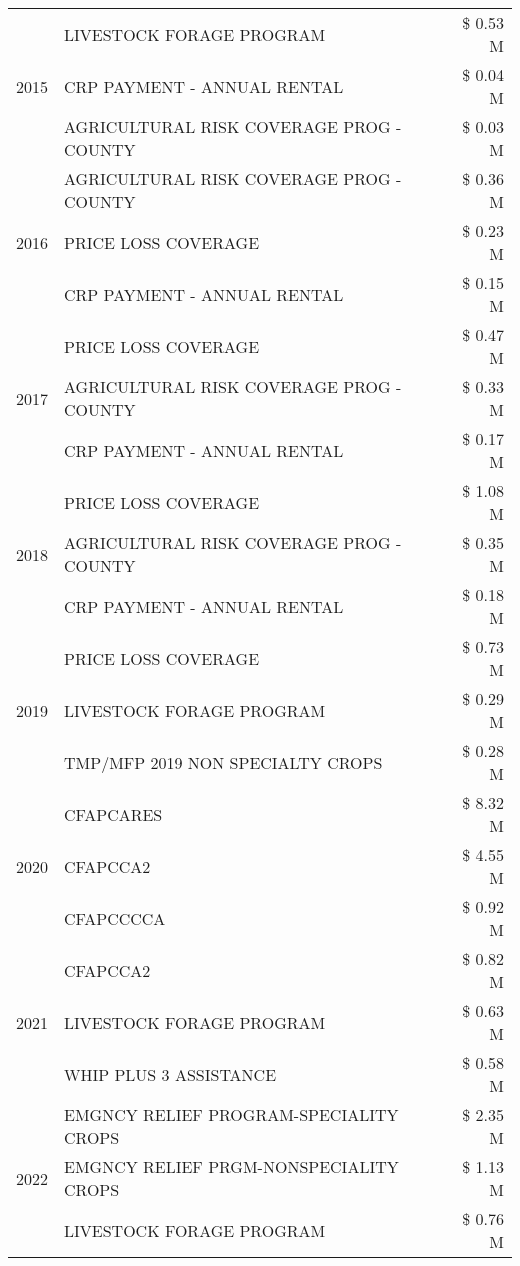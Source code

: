 \begin{tabular}{llr}
\cline{1-3}
\multirow[t]{3}{*}{2015} & LIVESTOCK FORAGE PROGRAM & \$ 0.53 M \\
 & CRP PAYMENT - ANNUAL RENTAL & \$ 0.04 M \\
 & AGRICULTURAL RISK COVERAGE PROG - COUNTY & \$ 0.03 M \\
\cline{1-3}
\multirow[t]{3}{*}{2016} & AGRICULTURAL RISK COVERAGE PROG - COUNTY & \$ 0.36 M \\
 & PRICE LOSS COVERAGE & \$ 0.23 M \\
 & CRP PAYMENT - ANNUAL RENTAL & \$ 0.15 M \\
\cline{1-3}
\multirow[t]{3}{*}{2017} & PRICE LOSS COVERAGE & \$ 0.47 M \\
 & AGRICULTURAL RISK COVERAGE PROG - COUNTY & \$ 0.33 M \\
 & CRP PAYMENT - ANNUAL RENTAL & \$ 0.17 M \\
\cline{1-3}
\multirow[t]{3}{*}{2018} & PRICE LOSS COVERAGE & \$ 1.08 M \\
 & AGRICULTURAL RISK COVERAGE PROG - COUNTY & \$ 0.35 M \\
 & CRP PAYMENT - ANNUAL RENTAL & \$ 0.18 M \\
\cline{1-3}
\multirow[t]{3}{*}{2019} & PRICE LOSS COVERAGE & \$ 0.73 M \\
 & LIVESTOCK FORAGE PROGRAM & \$ 0.29 M \\
 & TMP/MFP 2019 NON SPECIALTY CROPS & \$ 0.28 M \\
\cline{1-3}
\multirow[t]{3}{*}{2020} & CFAPCARES & \$ 8.32 M \\
 & CFAPCCA2 & \$ 4.55 M \\
 & CFAPCCCCA & \$ 0.92 M \\
\cline{1-3}
\multirow[t]{3}{*}{2021} & CFAPCCA2 & \$ 0.82 M \\
 & LIVESTOCK FORAGE PROGRAM & \$ 0.63 M \\
 & WHIP PLUS 3 ASSISTANCE & \$ 0.58 M \\
\cline{1-3}
\multirow[t]{3}{*}{2022} & EMGNCY RELIEF PROGRAM-SPECIALITY CROPS & \$ 2.35 M \\
 & EMGNCY RELIEF PRGM-NONSPECIALITY CROPS & \$ 1.13 M \\
 & LIVESTOCK FORAGE PROGRAM & \$ 0.76 M \\
\cline{1-3}
\bottomrule
\end{tabular}
